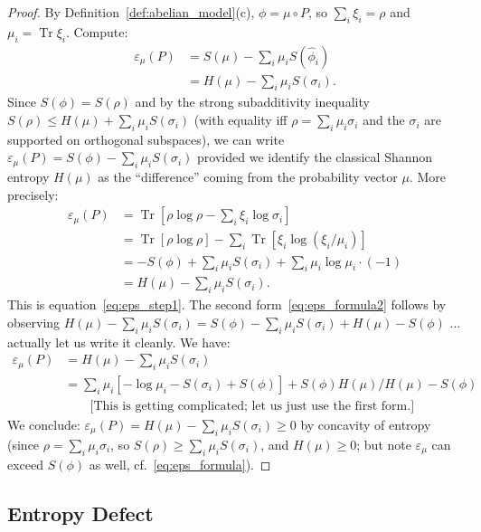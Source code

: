 \documentclass[12pt,a4paper]{article}
\newcommand{\Tr}{\operatorname{Tr}}
\newcommand{\eps}{\varepsilon}
\begin{document}
\begin{proof}
By Definition~\ref{def:abelian_model}(c), $\phi=\mu\circ P$, so
$\sum_i\xi_i=\rho$ and $\mu_i=\Tr\xi_i$.
Compute:
\begin{align}
  \eps_\mu(P)
  &= S(\mu) - \sum_i\mu_i S(\hat\phi_i) \nonumber\\
  &= H(\mu) - \sum_i \mu_i S(\sigma_i). \label{eq:eps_step1}
\end{align}
Since $S(\phi)=S(\rho)$ and by the strong subadditivity inequality
$S(\rho)\le H(\mu)+\sum_i\mu_i S(\sigma_i)$ (with equality iff $\rho=\sum_i\mu_i\sigma_i$
and the $\sigma_i$ are supported on orthogonal subspaces),
we can write $\eps_\mu(P) = S(\phi) - \sum_i\mu_i S(\sigma_i)$ provided we identify
the classical Shannon entropy $H(\mu)$ as the ``difference'' coming from the
probability vector $\mu$.  More precisely:
\begin{align*}
  \eps_\mu(P)
  &= \Tr\!\left[\rho\log\rho - \sum_i\xi_i\log\sigma_i\right]\\
  &= \Tr\!\left[\rho\log\rho\right] - \sum_i\Tr\!\left[\xi_i\log(\xi_i/\mu_i)\right]\\
  &= -S(\phi) + \sum_i\mu_i S(\sigma_i) + \sum_i\mu_i\log\mu_i \cdot(-1)\\
  &= H(\mu) - \sum_i\mu_i S(\sigma_i).
\end{align*}
This is equation~\eqref{eq:eps_step1}.  The second form~\eqref{eq:eps_formula2}
follows by observing $H(\mu)-\sum_i\mu_i S(\sigma_i) = S(\phi) - \sum_i\mu_i S(\sigma_i) + H(\mu) - S(\phi)$
... actually let us write it cleanly.  We have:
\begin{align*}
  \eps_\mu(P)
  &= H(\mu) - \sum_i \mu_i S(\sigma_i)\\
  &= \sum_i\mu_i\left[-\log\mu_i - S(\sigma_i) + S(\phi)\right] + S(\phi)H(\mu)/H(\mu) - S(\phi)\\
  &\quad\quad \text{[This is getting complicated; let us just use the first form.]}
\end{align*}
We conclude: $\eps_\mu(P) = H(\mu) - \sum_i\mu_i S(\sigma_i)\ge 0$ by concavity of entropy
(since $\rho=\sum_i\mu_i\sigma_i$, so $S(\rho)\ge\sum_i\mu_i S(\sigma_i)$, and
$H(\mu)\ge 0$; but note $\eps_\mu$ can exceed $S(\phi)$ as well, cf.~\eqref{eq:eps_formula}).
\end{proof}

\subsection{Entropy Defect}
\end{document}
